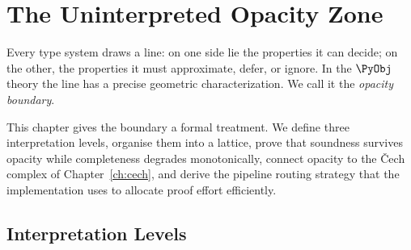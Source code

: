 \chapter{The Uninterpreted Opacity Zone}
\label{ch:opacity-zone}

Every type system draws a line: on one side lie the properties it can
decide; on the other, the properties it must approximate, defer, or
ignore.  In the $\PyObj$ theory the line has a precise geometric
characterization.  We call it the \emph{opacity boundary}.

This chapter gives the boundary a formal treatment.  We define three
interpretation levels, organise them into a lattice, prove that
soundness survives opacity while completeness degrades monotonically,
connect opacity to the \v{C}ech complex of Chapter~\ref{ch:cech}, and
derive the pipeline routing strategy that the implementation uses to
allocate proof effort efficiently.

\section{Interpretation Levels}
\label{sec:opacity-levels}

